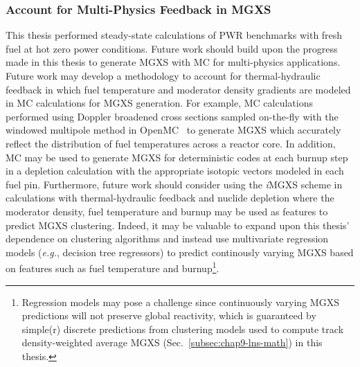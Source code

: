


\subsubsection{Account for Multi-Physics Feedback in MGXS}
\label{subsubsec:chap12-multi-physics-mgxs}

This thesis performed steady-state calculations of \ac{PWR} benchmarks with fresh fuel at hot zero power conditions. Future work should build upon the progress made in this thesis to generate \ac{MGXS} with \ac{MC} for multi-physics applications. Future work may develop a methodology to account for thermal-hydraulic feedback in which fuel temperature and moderator density gradients are modeled in \ac{MC} calculations for \ac{MGXS} generation. For example, \ac{MC} calculations performed using Doppler broadened cross sections sampled on-the-fly with the windowed multipole method in OpenMC~\cite{forget2014direct} to generate \ac{MGXS} which accurately reflect the distribution of fuel temperatures across a reactor core. In addition, \ac{MC} may be used to generate \ac{MGXS} for deterministic codes at each burnup step in a depletion calculation with the appropriate isotopic vectors modeled in each fuel pin. Furthermore, future work should consider using the \textit{i}\ac{MGXS} scheme in calculations with thermal-hydraulic feedback and nuclide depletion where the moderator density, fuel temperature and burnup may be used as features to predict MGXS clustering. Indeed, it may be valuable to expand upon this thesis' dependence on clustering algorithms and instead use multivariate regression models (\textit{e.g.}, decision tree regressors) to predict continously varying \ac{MGXS} based on features such as fuel temperature and burnup\footnote{Regression models may pose a challenge since continuously varying \ac{MGXS} predictions will not preserve global reactivity, which is guaranteed by simple(r) discrete predictions from clustering models used to compute track density-weighted average \ac{MGXS} (Sec.~\ref{subsec:chap9-lns-math}) in this thesis.}.

